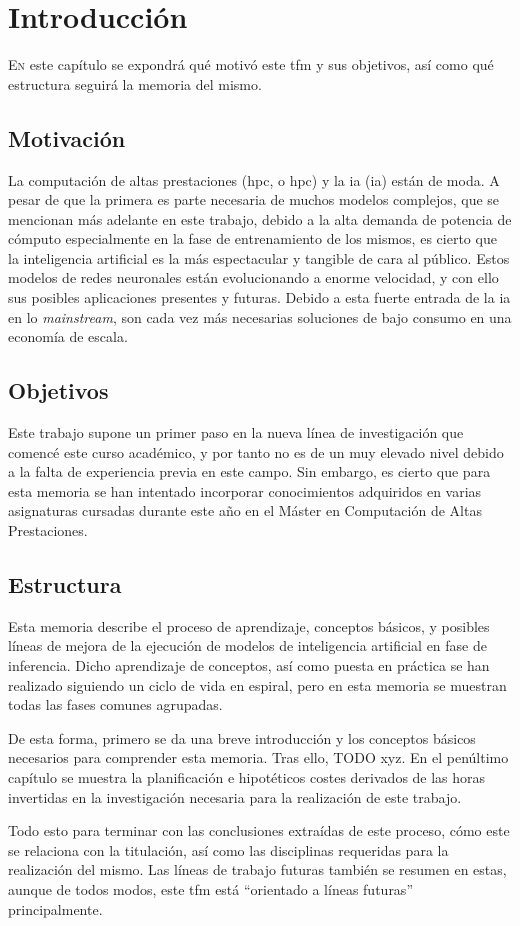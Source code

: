 \chapter{Introducción}
\label{chap:introducion}

\lettrine{E}{n} este capítulo se expondrá qué motivó este \acrlong{tfm} y sus objetivos, así como qué estructura seguirá la memoria del mismo.

\section{Motivación}
\label{sec:motivacion}
La computación de altas prestaciones (\acrshort{hpc}, o \acrlong{hpc}) y la \acrlong{ia} (\acrshort{ia}) están de moda. A pesar de que la primera es parte necesaria de muchos modelos complejos, que se mencionan más adelante en este trabajo, debido a la alta demanda de potencia de cómputo especialmente en la fase de entrenamiento de los mismos, es cierto que la inteligencia artificial es la más espectacular y tangible de cara al público.
Estos modelos de redes neuronales están evolucionando a enorme velocidad, y con ello sus posibles aplicaciones presentes y futuras. Debido a esta fuerte entrada de la \acrshort{ia} en lo \textit{mainstream}, son cada vez más necesarias soluciones de bajo consumo en una economía de escala.

\section{Objetivos}
\label{sec:objetivos}
Este trabajo supone un primer paso en la nueva línea de investigación que comencé este curso académico, y por tanto no es de un muy elevado nivel debido a la falta de experiencia previa en este campo. Sin embargo, es cierto que para esta memoria se han intentado incorporar conocimientos adquiridos en varias asignaturas cursadas durante este año en el Máster en Computación de Altas Prestaciones.

\section{Estructura}
\label{sec:estructura}
Esta memoria describe el proceso de aprendizaje, conceptos básicos, y posibles líneas de mejora de la ejecución de modelos de inteligencia artificial en fase de inferencia. Dicho aprendizaje de conceptos, así como puesta en práctica se han realizado siguiendo un ciclo de vida en espiral, pero en esta memoria se muestran todas las fases comunes agrupadas.

De esta forma, primero se da una breve introducción y los conceptos básicos necesarios para comprender esta memoria. Tras ello, TODO xyz.
En el penúltimo capítulo se muestra la planificación e hipotéticos costes derivados de las horas invertidas en la investigación necesaria para la realización de este trabajo.

Todo esto para terminar con las conclusiones extraídas de este proceso, cómo este se relaciona con la titulación, así como las disciplinas requeridas para la realización del mismo. Las líneas de trabajo futuras también se resumen en estas, aunque de todos modos, este \acrshort{tfm} está ``orientado a líneas futuras'' principalmente.

